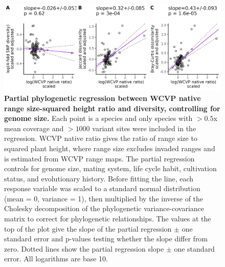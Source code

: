\documentclass[12pt]{article}
\begin{document}
\begin{figure}[H]
    \centering
    \includegraphics[width=\textwidth]{figures/appendix_d/wcvp_native_popsize_vs_diversity_genome-size-corrected_2024-12-12.jpg}
    \caption{\textbf{Partial phylogenetic regression between WCVP native range size-squared height ratio and diversity, controlling for genome size.} Each point is a species and only species with $>0.5$x mean coverage and $>1000$ variant sites were included in the regression. WCVP native ratio gives the ratio of range size to squared plant height, where range size excludes invaded ranges and is estimated from WCVP range maps. The partial regression controls for genome size, mating system, life cycle habit, cultivation status, and evolutionary history. Before fitting the line, each response variable was scaled to a standard normal distribution (mean = 0, variance = 1), then multiplied by the inverse of the Cholesky decomposition of the phylogenetic variance-covariance matrix to correct for phylogenetic relationships. The values at the top of the plot give the slope of the partial regression $\pm$ one standard error and p-values testing whether the slope differ from zero. Dotted lines show the partial regression slope $\pm$ one standard error. All logarithms are base 10.}
\end{figure}
\end{document}
